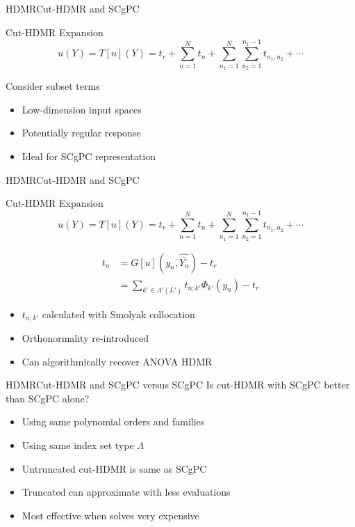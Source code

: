 \documentclass{beamer}
\begin{document}
\begin{frame}{HDMR}{Cut-HDMR and SCgPC}
  \begin{block}{Cut-HDMR Expansion}
    \[u(Y) = T[u](Y) = t_r + \sum_{n=1}^N t_n + \sum_{n_1=1}^N\sum_{n_2=1}^{n_1-1} t_{n_1,n_2}+\cdots\]
  \end{block}
  Consider subset terms
  \begin{itemize}
    \item Low-dimension input spaces
    \item Potentially regular response
    \item Ideal for SCgPC representation
  \end{itemize}
\end{frame}

\begin{frame}{HDMR}{Cut-HDMR and SCgPC}
  \begin{block}{Cut-HDMR Expansion}
    \[u(Y) = T[u](Y) = t_r + \sum_{n=1}^N t_n + \sum_{n_1=1}^N\sum_{n_2=1}^{n_1-1} t_{n_1,n_2}+\cdots\]
  \end{block}\vspace{-20pt}
  \begin{align*}
    t_n &= G[u](y_n,\hat{\bar{Y_n}}) - t_r \\
    &= \sum_{k'\in\Lambda'(L')} t_{n;k'}\Phi_{k'}(y_n) - t_r
  \end{align*}
  \begin{itemize}
    \item $t_{n;k'}$ calculated with Smolyak collocation
    \item Orthonormality re-introduced
    \item Can algorithmically recover ANOVA HDMR
  \end{itemize}
\end{frame}

\begin{frame}{HDMR}{Cut-HDMR and SCgPC versus SCgPC}
  \vfill
  Is cut-HDMR with SCgPC better than SCgPC alone?
  \vfill
  \begin{itemize}
    \item Using same polynomial orders and families
  \vfill
    \item Using same index set type $\Lambda$
  \vfill
    \item Untruncated cut-HDMR is same as SCgPC
  \vfill
    \item Truncated can approximate with less evaluations
  \vfill
    \item Most effective when solves very expensive
  \end{itemize}
  \vfill
\end{frame}
\end{document}
